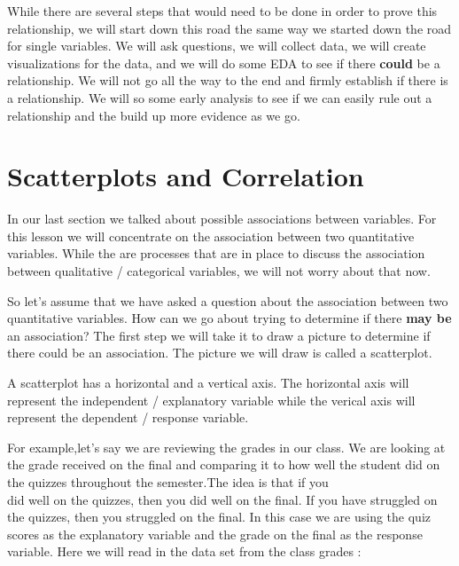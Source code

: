\documentclass[
  letterpaper,
  DIV=11,
  numbers=noendperiod]{scrreprt}
\begin{document}
While there are several steps that would need to be done in order to
prove this relationship, we will start down this road the same way we
started down the road for single variables. We will ask questions, we
will collect data, we will create visualizations for the data, and we
will do some EDA to see if there \textbf{could} be a relationship. We
will not go all the way to the end and firmly establish if there is a
relationship. We will so some early analysis to see if we can easily
rule out a relationship and the build up more evidence as we go.


\chapter*{Scatterplots and
Correlation}\label{scatterplots-and-correlation}


In our last section we talked about possible associations between
variables. For this lesson we will concentrate on the association
between two quantitative variables. While the are processes that are in
place to discuss the association between qualitative / categorical
variables, we will not worry about that now.

So let's assume that we have asked a question about the association
between two quantitative variables. How can we go about trying to
determine if there \textbf{may be} an association? The first step we
will take it to draw a picture to determine if there could be an
association. The picture we will draw is called a scatterplot.

A scatterplot has a horizontal and a vertical axis. The horizontal axis
will represent the independent / explanatory variable while the verical
axis will represent the dependent / response variable.

For example,let's say we are reviewing the grades in our class. We are
looking at the grade received on the final and comparing it to how well
the student did on the quizzes throughout the semester.The idea is that
if you\\
did well on the quizzes, then you did well on the final. If you have
struggled on the quizzes, then you struggled on the final. In this case
we are using the quiz scores as the explanatory variable and the grade
on the final as the response variable. Here we will read in the data set
from the class grades :
\end{document}
